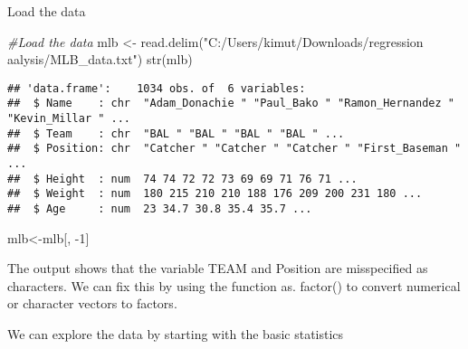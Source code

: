 \documentclass[
]{article}
\newenvironment{Shaded}{\begin{snugshade}}{\end{snugshade}}
\newcommand{\CommentTok}[1]{\textcolor[rgb]{0.56,0.35,0.01}{\textit{#1}}}
\newcommand{\DecValTok}[1]{\textcolor[rgb]{0.00,0.00,0.81}{#1}}
\newcommand{\FunctionTok}[1]{\textcolor[rgb]{0.00,0.00,0.00}{#1}}
\newcommand{\NormalTok}[1]{#1}
\newcommand{\OtherTok}[1]{\textcolor[rgb]{0.56,0.35,0.01}{#1}}
\newcommand{\SpecialCharTok}[1]{\textcolor[rgb]{0.00,0.00,0.00}{#1}}
\newcommand{\StringTok}[1]{\textcolor[rgb]{0.31,0.60,0.02}{#1}}
\begin{document}
Load the data

\begin{Shaded}
\begin{Highlighting}[]
\CommentTok{\#Load the data}
\NormalTok{mlb }\OtherTok{\textless{}{-}} \FunctionTok{read.delim}\NormalTok{(}\StringTok{"C:/Users/kimut/Downloads/regression aalysis/MLB\_data.txt"}\NormalTok{)}
\FunctionTok{str}\NormalTok{(mlb)}
\end{Highlighting}
\end{Shaded}

\begin{verbatim}
## 'data.frame':    1034 obs. of  6 variables:
##  $ Name    : chr  "Adam_Donachie " "Paul_Bako " "Ramon_Hernandez " "Kevin_Millar " ...
##  $ Team    : chr  "BAL " "BAL " "BAL " "BAL " ...
##  $ Position: chr  "Catcher " "Catcher " "Catcher " "First_Baseman " ...
##  $ Height  : num  74 74 72 72 73 69 69 71 76 71 ...
##  $ Weight  : num  180 215 210 210 188 176 209 200 231 180 ...
##  $ Age     : num  23 34.7 30.8 35.4 35.7 ...
\end{verbatim}

\begin{Shaded}
\begin{Highlighting}[]
\NormalTok{mlb}\OtherTok{\textless{}{-}}\NormalTok{mlb[, }\SpecialCharTok{{-}}\DecValTok{1}\NormalTok{]}
\end{Highlighting}
\end{Shaded}

The output shows that the variable TEAM and Position are misspecified as
characters. We can fix this by using the function as. factor() to
convert numerical or character vectors to factors.

\begin{Shaded}
\end{Shaded}

We can explore the data by starting with the basic statistics

\begin{Shaded}
\end{Shaded}
\end{document}
